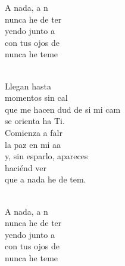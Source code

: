 \documentclass[12pt]{article}
\begin{document}
\begin{multicols*}{2}
\begin{cancion}
	\begin{chorus}%
	A nada, a n  \\
	nunca he de ter\\
	yendo junto a \\
	con tus ojos de \\
	nunca he  teme\\
	\end{chorus}%
	\jump\\
	Llegan hasta   \\
	momentos sin cal  \\
	que me hacen dud de si mi cam\\
	se orienta ha Ti.\\
\jump
	Comienza a falr \\
	la paz en mi aa \\
	y, sin esparlo, apareces \\
	haciénd ver\\
	que a nada he de tem.\\\jump\\
	\begin{chorus}%
	A nada, a n  \\
	nunca he de ter\\
	yendo junto a \\
	con tus ojos de \\
	nunca he  teme\\
	\end{chorus}%
	\jump\\
\end{cancion}%


\end{multicols*}
\end{document}
